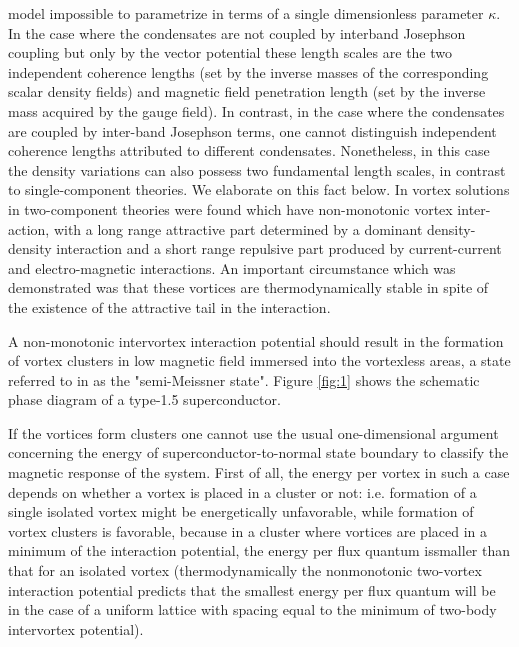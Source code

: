 model impossible to parametrize in terms of a single dimensionless parameter 
\( \kappa \). In the case where the condensates are not coupled by interband 
Josephson coupling but only by the vector potential these length scales are
the two independent coherence lengths (set by the inverse masses of the 
corresponding scalar density fields) and magnetic field penetration length 
(set by the inverse mass acquired by the gauge field). In contrast, in the 
case where the condensates are coupled by inter-band Josephson terms, one 
cannot distinguish independent coherence lengths attributed to different 
condensates. Nonetheless, in this case the density variations can also possess 
two fundamental length scales\cite{bib:2}, in contrast to single-component 
theories. We elaborate on this fact below. In \cite{bib:1,bib:2} vortex 
solutions in two-component theories were found which have non-monotonic 
vortex inter-action, with a long range attractive part determined by a 
dominant density-density interaction and a short range repulsive part produced 
by current-current and electro-magnetic interactions. An important 
circumstance which was demonstrated was that these vortices are 
thermodynamically stable in spite of the existence of the attractive tail in 
the interaction.

A non-monotonic intervortex interaction potential should result in the 
formation of vortex clusters in low magnetic field immersed into the 
vortexless areas, a state referred to in \cite{bib:1} as the "semi-Meissner 
state". Figure \ref{fig:1} shows the schematic phase diagram of a type-1.5 
superconductor.

If the vortices form clusters one cannot use the usual one-dimensional 
argument concerning the energy of superconductor-to-normal state boundary to 
classify the magnetic response of the system. First of all, the energy per 
vortex in such a case depends on whether a vortex is placed in a cluster or 
not: i.e. formation of a single isolated vortex might be energetically 
unfavorable, while formation of vortex clusters is favorable, because in a 
cluster where vortices are placed in a minimum of the interaction potential, 
the energy per flux quantum issmaller than that for an isolated vortex 
(thermodynamically the nonmonotonic two-vortex interaction potential predicts 
that the smallest energy per flux quantum will be in the case of a uniform 
lattice with spacing equal to the minimum of two-body intervortex potential).


